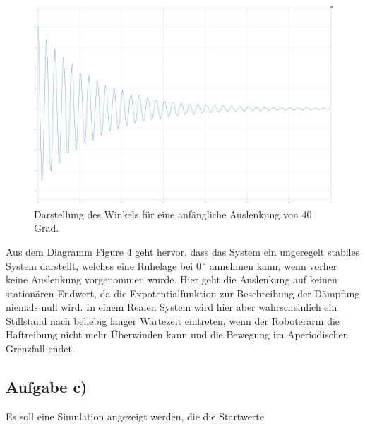 \documentclass[10pt]{scrartcl}
\begin{document}
\begin{figure}[H]
	\centering
	\includegraphics[width=1\textwidth]{WinkelanzeigeinGrad3b.jpeg}
	\caption{Darstellung des Winkels für eine anfängliche Auslenkung von 40 Grad. }
	\label{img:grafik-dummy}
\end{figure}
Aus dem Diagramm Figure 4 geht hervor, dass das System ein ungeregelt stabiles System darstellt, welches eine Ruhelage bei 0\,$^\circ$ annehmen kann, wenn vorher keine Auslenkung vorgenommen wurde. Hier geht die Auslenkung auf keinen stationären Endwert, da die Expotentialfunktion zur Beschreibung der Dämpfung niemals null wird. In einem Realen System wird hier aber wahrscheinlich ein Stillstand nach beliebig langer Wartezeit eintreten, wenn der Roboterarm die Haftreibung nicht mehr Überwinden kann und die Bewegung im Aperiodischen Grenzfall endet.

\newpage
\subsection{Aufgabe c)}
Es soll eine Simulation angezeigt werden, die die Startwerte 
\end{document}
